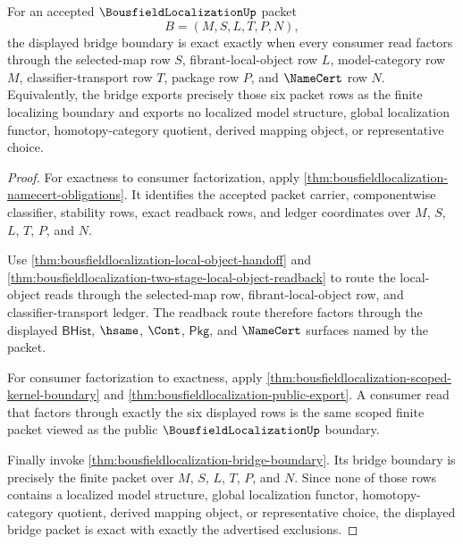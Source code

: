 \begin{theorem}
\label{thm:bousfieldlocalization-displayed-packet-bridge-exactness}
For an accepted $\BousfieldLocalizationUp$ packet
$$
B=(M,S,L,T,P,N),
$$
the displayed bridge boundary is exact exactly when every consumer read factors
through the selected-map row $S$, fibrant-local-object row $L$,
model-category row $M$, classifier-transport row $T$, package row $P$, and
$\NameCert$ row $N$. Equivalently, the bridge exports precisely those six
packet rows as the finite localizing boundary and exports no localized model
structure, global localization functor, homotopy-category quotient, derived
mapping object, or representative choice.
\end{theorem}
\begin{proof}
For exactness to consumer factorization, apply
\autoref{thm:bousfieldlocalization-namecert-obligations}. It identifies the
accepted packet carrier, componentwise classifier, stability rows, exact
readback rows, and ledger coordinates over $M$, $S$, $L$, $T$, $P$, and $N$.

Use \autoref{thm:bousfieldlocalization-local-object-handoff} and
\autoref{thm:bousfieldlocalization-two-stage-local-object-readback} to route
the local-object reads through the selected-map row, fibrant-local-object row,
and classifier-transport ledger. The readback route therefore factors through
the displayed $\mathsf{BHist}$, $\hsame$, $\Cont$, $\mathsf{Pkg}$, and
$\NameCert$ surfaces named by the packet.

For consumer factorization to exactness, apply
\autoref{thm:bousfieldlocalization-scoped-kernel-boundary} and
\autoref{thm:bousfieldlocalization-public-export}. A consumer read that factors
through exactly the six displayed rows is the same scoped finite packet viewed
as the public $\BousfieldLocalizationUp$ boundary.

Finally invoke \autoref{thm:bousfieldlocalization-bridge-boundary}. Its bridge
boundary is precisely the finite packet over $M$, $S$, $L$, $T$, $P$, and $N$.
Since none of those rows contains a localized model structure, global
localization functor, homotopy-category quotient, derived mapping object, or
representative choice, the displayed bridge packet is exact with exactly the
advertised exclusions.
\end{proof}

